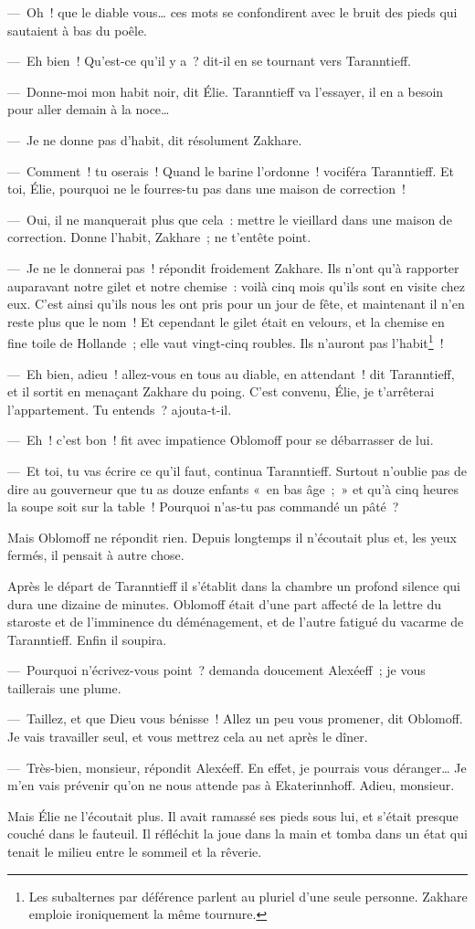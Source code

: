 \documentclass[french,twoside]{book} %
\begin{document}
— Oh ! que le diable vous… ces mots se confondirent avec le bruit des pieds qui sautaient à bas du poêle.\par
— Eh bien ! Qu’est-ce qu’il y a ? dit-il en se tournant vers Taranntieff.\par
— Donne-moi mon habit noir, dit Élie. Taranntieff va l’essayer, il en a besoin pour aller demain à la noce…\par
— Je ne donne pas d’habit, dit résolument Zakhare.\par
— Comment ! tu oserais ! Quand le barine l’ordonne ! vociféra Taranntieff. Et toi, Élie, pourquoi ne le fourres-tu pas dans une maison de correction !\par
— Oui, il ne manquerait plus que cela : mettre le vieillard dans une maison de correction. Donne l’habit, Zakhare ; ne t’entête point.\par
— Je ne le donnerai pas ! répondit froidement Zakhare. Ils n’ont qu’à rapporter auparavant notre gilet et notre chemise : voilà cinq mois qu’ils sont en visite chez eux. C’est ainsi qu’ils nous les ont pris pour un jour de fête, et maintenant il n’en reste plus que le nom ! Et cependant le gilet était en velours, et la chemise en fine toile de Hollande ; elle vaut vingt-cinq roubles. Ils n’auront pas l’habit\footnote{Les subalternes par déférence parlent au pluriel d’une seule personne. Zakhare emploie ironiquement la même tournure.} !\par
— Eh bien, adieu ! allez-vous en tous au diable, en attendant ! dit Taranntieff, et il sortit en menaçant Zakhare du poing. C’est convenu, Élie, je t’arrêterai l’appartement. Tu entends ? ajouta-t-il.\par
— Eh ! c’est bon ! fit avec impatience Oblomoff pour se débarrasser de lui.\par
— Et toi, tu vas écrire ce qu’il faut, continua Taranntieff. Surtout n’oublie pas de dire au gouverneur que tu as douze enfants « en bas âge ; » et qu’à cinq heures la soupe soit sur la table ! Pourquoi n’as-tu pas commandé un pâté ?\par
Mais Oblomoff ne répondit rien. Depuis longtemps il n’écoutait plus et, les yeux fermés, il pensait à autre chose.\par
Après le départ de Taranntieff il s’établit dans la chambre un profond silence qui dura une dizaine de minutes. Oblomoff était d’une part affecté de la lettre du staroste et de l’imminence du déménagement, et de l’autre fatigué du vacarme de Taranntieff. Enfin il soupira.\par
— Pourquoi n’écrivez-vous point ? demanda doucement Alexéeff ; je vous taillerais une plume.\par
— Taillez, et que Dieu vous bénisse ! Allez un peu vous promener, dit Oblomoff. Je vais travailler seul, et vous mettrez cela au net après le dîner.\par
— Très-bien, monsieur, répondit Alexéeff. En effet, je pourrais vous déranger… Je m’en vais prévenir qu’on ne nous attende pas à Ekaterinnhoff. Adieu, monsieur.\par
Mais Élie ne l’écoutait plus. Il avait ramassé ses pieds sous lui, et s’était presque couché dans le fauteuil. Il réfléchit la joue dans la main et tomba dans un état qui tenait le milieu entre le sommeil et la rêverie.
\end{document}
